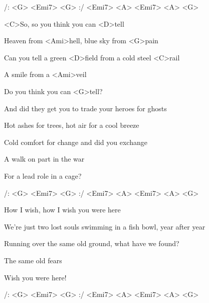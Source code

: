 
/: <G> <Emi7> <G> :/ <Emi7> <A> <Emi7> <A> <G>

\zs
<C>So, so you think you can <D>tell

Heaven from <Ami>hell, blue sky from <G>pain

Can you tell a green <D>field from a cold steel <C>rail

A smile from a <Ami>veil

Do you think you can <G>tell?
\ks

\zs
And did they get you to {trade} your heroes for {ghosts}

Hot ashes for {trees}, hot air for a cool {breeze}

Cold comfort for {change}
and did you exchange

A walk on part in the {war}

For a lead role in a cage?
\ks

/: <G> <Emi7> <G> :/ <Emi7> <A> <Emi7> <A> <G>

\zs
{How} I wish, how I wish you were {here}

We're just {two} lost souls swimming in a fish bowl, {year} after year

{Running} over the same old ground, what {have} we found?

The same old {fears}

Wish you were {here}!
\ks

/: <G> <Emi7> <G> :/ <Emi7> <A> <Emi7> <A> <G>


\kp



















